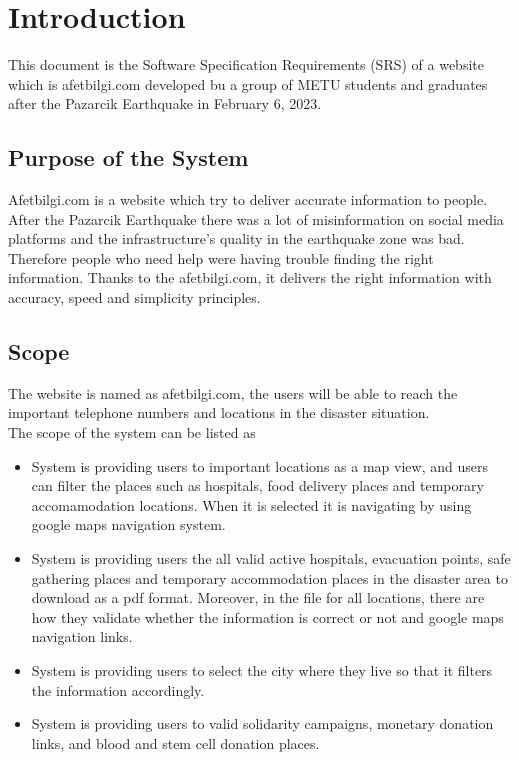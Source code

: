 \chapter{Introduction}

This document is the Software Specification Requirements (SRS) of a website which is afetbilgi.com developed bu a group of METU students and graduates after the Pazarcik Earthquake in February 6, 2023.

\section{Purpose of the System}

Afetbilgi.com is a website which try to deliver accurate information to people.
After the Pazarcik Earthquake there was a lot of misinformation on social media platforms and the infrastructure's quality in the earthquake zone was bad. 
Therefore people who need help were having trouble finding the right information.
Thanks to the afetbilgi.com, it delivers the right information with accuracy, speed and simplicity principles.

\section{Scope}

The website is named as afetbilgi.com, the users will be able to reach the important telephone numbers and locations in the disaster situation. \\
The scope of the system can be listed as \\
\begin{itemize}
    \item System is providing users to important locations as a map view, and users can filter the places such as hospitals, food delivery places and temporary accomamodation locations. When it is selected it is navigating by using google maps navigation system.
    \item System is providing users the all valid active hospitals, evacuation points, safe gathering places and temporary accommodation places in the disaster area to download as a pdf format. Moreover, in the file for all locations, there are how they validate whether the information is correct or not and google maps navigation links.
    \item System is providing users to select the city where they live so that it filters the information accordingly.
    \item System is providing users to valid solidarity campaigns, monetary donation links, and blood and stem cell donation places. 
\end{itemize}

